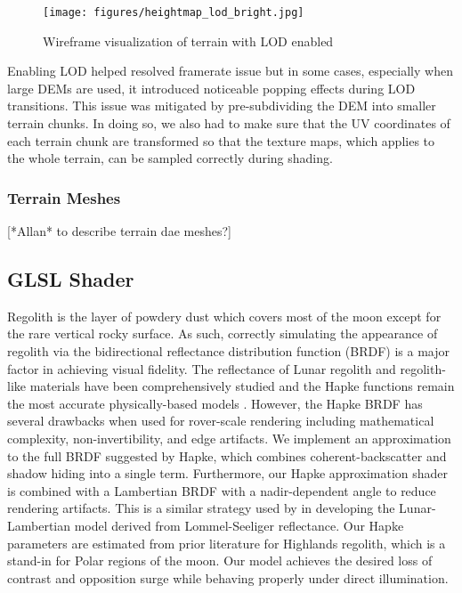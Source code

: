 \documentclass[twocolumn,letterpaper]{IEEEAerospaceCLS}  %
\begin{document}
\begin{figure}[h!]
	\texttt{[image: figures/heightmap\_lod\_bright.jpg]}
   	\caption{Wireframe visualization of terrain with LOD enabled}
    \label{fig:heightmaplod}
\end{figure}

Enabling LOD helped resolved framerate issue but in some cases, especially when large DEMs are used, it introduced noticeable popping effects during LOD transitions. This issue was mitigated by pre-subdividing the DEM into smaller terrain chunks. In doing so, we also had to make sure that the UV coordinates of each terrain chunk are transformed so that the texture maps, which applies to the whole terrain, can be sampled correctly during shading.

\subsubsection{Terrain Meshes}

[*Allan* to describe terrain dae meshes?]

\subsection{GLSL Shader}
Regolith is the layer of powdery dust which covers most of the moon except for the rare vertical rocky surface. As such, correctly simulating the appearance of regolith via the bidirectional reflectance distribution function (BRDF) is a major factor in achieving visual fidelity. The reflectance of Lunar regolith and regolith-like materials have been comprehensively studied and the Hapke functions remain the most accurate physically-based models \cite{hapke11}. However, the Hapke BRDF has several drawbacks when used for rover-scale rendering including mathematical complexity, non-invertibility, and edge artifacts\cite{wong2012}. We implement an approximation to the full BRDF suggested by Hapke, which combines coherent-backscatter and shadow hiding into a single term. Furthermore, our Hapke approximation shader is combined with a Lambertian BRDF with a nadir-dependent angle to reduce rendering artifacts. This is a similar strategy used by \cite{McEwen1996} in developing the Lunar-Lambertian model derived from Lommel-Seeliger reflectance. Our Hapke parameters are estimated from prior literature for Highlands regolith, which is a stand-in for Polar regions of the moon. Our model achieves the desired loss of contrast and opposition surge while behaving properly under direct illumination.           
\end{document}
